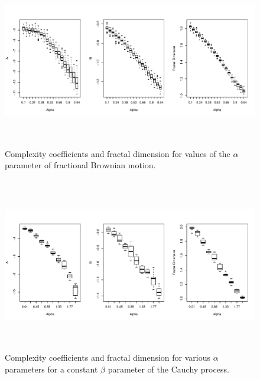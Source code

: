 \begin{figure}[!htbp]
  \begin{center}
  \includegraphics[height = 3in, width =6in, keepaspectratio]{./figs/fBm-coeffs-boxplots.pdf}
  \end{center}
  \caption{Complexity coefficients and fractal dimension for 
  values of the $\alpha$ parameter of fractional Brownian motion.} 
    \label{fig:fbm-boxplots}
\end{figure}

\begin{figure}[!htbp]
  \begin{center}
  \includegraphics[height = 3in, width =6in, keepaspectratio]{./figs/cauchy-boxplots.pdf}
  \end{center}
  \caption{Complexity coefficients and fractal dimension for 
  various $\alpha$ parameters for a constant $\beta$ parameter
  of the Cauchy process.} 
     \label{fig:cauchy-boxplots}
\end{figure}



